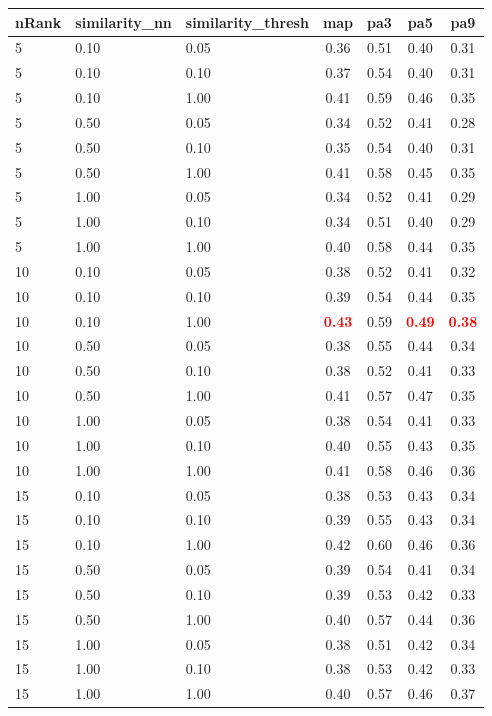 \begin{tabular}{lllcccc} 
nRank & similarity\_nn & similarity\_thresh & map & pa3 & pa5 & pa9 \\ 
\hline 
 5 & 0.10 & 0.05 & 0.36 & 0.51 & 0.40 & 0.31 \\ 
 5 & 0.10 & 0.10 & 0.37 & 0.54 & 0.40 & 0.31 \\ 
 5 & 0.10 & 1.00 & 0.41 & 0.59 & 0.46 & 0.35 \\ 
 5 & 0.50 & 0.05 & 0.34 & 0.52 & 0.41 & 0.28 \\ 
 5 & 0.50 & 0.10 & 0.35 & 0.54 & 0.40 & 0.31 \\ 
 5 & 0.50 & 1.00 & 0.41 & 0.58 & 0.45 & 0.35 \\ 
 5 & 1.00 & 0.05 & 0.34 & 0.52 & 0.41 & 0.29 \\ 
 5 & 1.00 & 0.10 & 0.34 & 0.51 & 0.40 & 0.29 \\ 
 5 & 1.00 & 1.00 & 0.40 & 0.58 & 0.44 & 0.35 \\ 
10 & 0.10 & 0.05 & 0.38 & 0.52 & 0.41 & 0.32 \\ 
10 & 0.10 & 0.10 & 0.39 & 0.54 & 0.44 & 0.35 \\ 
10 & 0.10 & 1.00 & \textbf{\textcolor{red}{0.43}} & 0.59 & \textbf{\textcolor{red}{0.49}} & \textbf{\textcolor{red}{0.38}} \\ 
10 & 0.50 & 0.05 & 0.38 & 0.55 & 0.44 & 0.34 \\ 
10 & 0.50 & 0.10 & 0.38 & 0.52 & 0.41 & 0.33 \\ 
10 & 0.50 & 1.00 & 0.41 & 0.57 & 0.47 & 0.35 \\ 
10 & 1.00 & 0.05 & 0.38 & 0.54 & 0.41 & 0.33 \\ 
10 & 1.00 & 0.10 & 0.40 & 0.55 & 0.43 & 0.35 \\ 
10 & 1.00 & 1.00 & 0.41 & 0.58 & 0.46 & 0.36 \\ 
15 & 0.10 & 0.05 & 0.38 & 0.53 & 0.43 & 0.34 \\ 
15 & 0.10 & 0.10 & 0.39 & 0.55 & 0.43 & 0.34 \\ 
15 & 0.10 & 1.00 & 0.42 & 0.60 & 0.46 & 0.36 \\ 
15 & 0.50 & 0.05 & 0.39 & 0.54 & 0.41 & 0.34 \\ 
15 & 0.50 & 0.10 & 0.39 & 0.53 & 0.42 & 0.33 \\ 
15 & 0.50 & 1.00 & 0.40 & 0.57 & 0.44 & 0.36 \\ 
15 & 1.00 & 0.05 & 0.38 & 0.51 & 0.42 & 0.34 \\ 
15 & 1.00 & 0.10 & 0.38 & 0.53 & 0.42 & 0.33 \\ 
15 & 1.00 & 1.00 & 0.40 & 0.57 & 0.46 & 0.37 \\ 

\end{tabular}
